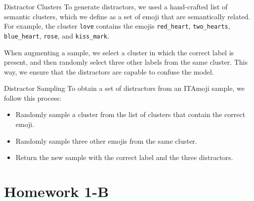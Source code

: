 \documentclass[english, xcolor={table,usenames}]{beamer}
\begin{document}
\begin{frame}{Distractor Clusters} %
  To generate distractors, we used a hand-crafted list of \alert{semantic clusters}, which we define as
  a set of emoji that are semantically related. For example, the cluster \texttt{love} contains the
  emojis \texttt{red\_heart}, \texttt{two\_hearts}, \texttt{blue\_heart}, \texttt{rose}, and \texttt{kiss\_mark}.

  When augmenting a sample, we select a cluster in which the correct label is present, and then randomly
  select three other labels from the same cluster. This way, we ensure that the distractors are
  capable to confuse the model.
\end{frame}

\begin{frame}{Distractor Sampling}
  To obtain a set of distractors from an ITAmoji sample, we follow this process:

  \begin{itemize}
    \item<1-> Randomly sample a cluster from the list of clusters that contain the correct emoji.
    \item<2-> Randomly sample three other emojis from the same cluster.
    \item<4-> Return the new sample with the correct label and the three distractors.
  \end{itemize}
\end{frame}

\section{Homework 1-B}
\end{document}
